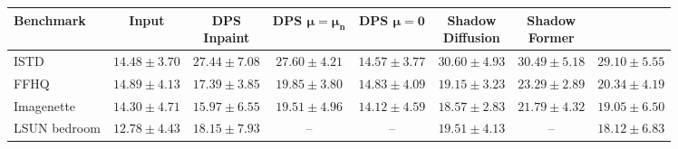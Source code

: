 \begin{table}[t]
{\begin{tabular}{@{}lccccccc@{}}
        \midrule
        \addlinespace[2pt]

        \textbf{Benchmark}
        & \textbf{Input}
        & \shortstack{\textbf{DPS}\\\textbf{Inpaint}}
        & \shortstack{\textbf{DPS}\\$\boldsymbol{\mu=\mu_n}$}
        & \shortstack{\textbf{DPS}\\$\boldsymbol{\mu=0}$}
        & \shortstack{\textbf{Shadow}\\\textbf{Diffusion}}
        & \shortstack{\textbf{Shadow}\\\textbf{Former}}
        & \textbf{\method{}}
        \\
        \midrule

        ISTD
        & $14.48 \pm 3.70$
        & $27.44 \pm 7.08$
        & $27.60 \pm 4.21$
        & $14.57 \pm 3.77$
        & $\mathbf{30.60 \pm 4.93}$
        & $30.49 \pm 5.18$
        & $29.10 \pm 5.55$
        \\

        FFHQ
        & $14.89 \pm 4.13$
        & $17.39 \pm 3.85$
        & $19.85 \pm 3.80$
        & $14.83 \pm 4.09$
        & $19.15 \pm 3.23$
        & $\mathbf{23.29 \pm 2.89}$
        & $20.34 \pm 4.19$
        \\

        Imagenette
        & $14.30 \pm 4.71$
        & $15.97 \pm 6.55$
        & $19.51 \pm 4.96$
        & $14.12 \pm 4.59$
        & $18.57 \pm 2.83$
        & $\mathbf{21.79 \pm 4.32}$
        & $19.05 \pm 6.50$
        \\

        LSUN bedroom
        & $12.78 \pm 4.43$
        & $18.15 \pm 7.93$
        & --
        & --
        & $\mathbf{19.51 \pm 4.13}$
        & --
        & $18.12 \pm 6.83$
        \\

        \bottomrule
    \end{tabular}%
    }
\end{table}
